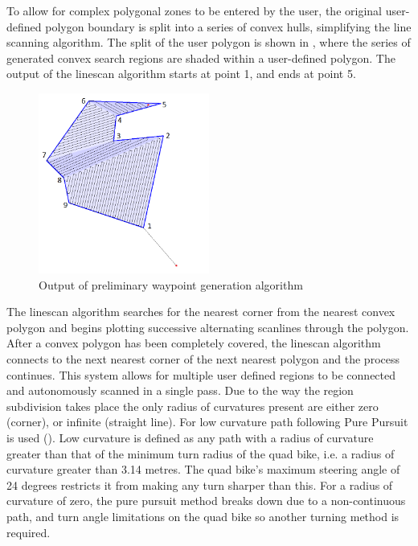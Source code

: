 \documentclass[main.tex]{subfiles}
\begin{document}
To allow for complex polygonal zones to be entered by the user, the original user-defined polygon boundary is split into a series of convex hulls, simplifying the line scanning algorithm. The split of the user polygon is shown in , where the series of generated convex search regions are shaded within a user-defined polygon. The output of the linescan algorithm starts at point 1, and ends at point 5. 
\begin{figure}[ht]
\includegraphics[width=0.5\textwidth]{4-DetailedDesign/lineScanAlgorithm2.png}
\centering
\caption{Output of preliminary waypoint generation algorithm} 
\end{figure}

The linescan algorithm searches for the nearest corner from the nearest convex polygon and begins plotting successive alternating scanlines through the polygon. After a convex polygon has been completely covered, the linescan algorithm connects to the next nearest corner of the next nearest polygon and the process continues. This system allows for multiple user defined regions to be connected and autonomously scanned in a single pass. Due to the way the region subdivision takes place the only radius of curvatures present are either zero (corner), or infinite (straight line).
For low curvature path following Pure Pursuit is used (). Low curvature is defined as any path with a radius of curvature greater than that of the minimum turn radius of the quad bike, i.e. a radius of curvature greater than 3.14 metres. The quad bike's maximum steering angle of 24 degrees restricts it from making any turn sharper than this. For a radius of curvature of zero, the pure pursuit method breaks down due to a non-continuous path, and turn angle limitations on the quad bike so another turning method is required.
\end{document}
